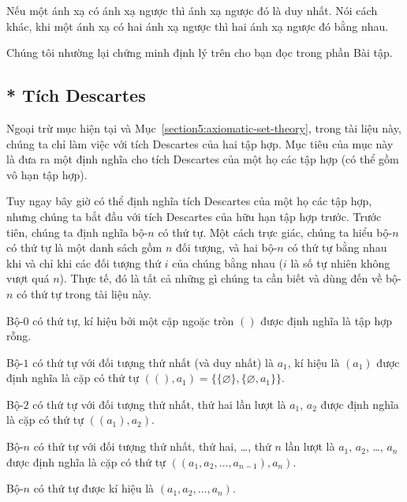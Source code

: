 \begin{theorem}
    Nếu một ánh xạ có ánh xạ ngược thì ánh xạ ngược đó là duy nhất. Nói cách khác, khi một ánh xạ có hai ánh xạ ngược thì hai ánh xạ ngược đó bằng nhau.
\end{theorem}

Chúng tôi nhường lại chứng minh định lý trên cho bạn đọc trong phần Bài tập.

\subsection{* Tích Descartes}

Ngoại trừ mục hiện tại và Mục~\ref{section5:axiomatic-set-theory}, trong tài liệu này, chúng ta chỉ làm việc với tích Descartes của hai tập hợp. Mục tiêu của mục này là đưa ra một định nghĩa cho tích Descartes của một họ các tập hợp (có thể gồm vô hạn tập hợp).

Tuy ngay bây giờ có thể định nghĩa tích Descartes của một họ các tập hợp, nhưng chúng ta bắt đầu với tích Descartes của hữu hạn tập hợp trước. Trước tiên, chúng ta định nghĩa bộ-$n$ có thứ tự. Một cách trực giác, chúng ta hiểu bộ-$n$ có thứ tự là một danh sách gồm $n$ đối tượng, và hai bộ-$n$ có thứ tự bằng nhau khi và chỉ khi các đối tượng thứ $i$ của chúng bằng nhau ($i$ là số tự nhiên không vượt quá $n$). Thực tế, đó là tất cả những gì chúng ta cần biết và dùng đến về bộ-$n$ có thứ tự trong tài liệu này.

\begin{definition}[Bộ-$n$ có thứ tự]
    Bộ-$0$ có thứ tự, kí hiệu bởi một cặp ngoặc tròn $()$ được định nghĩa là tập hợp rỗng.

    Bộ-$1$ có thứ tự với đối tượng thứ nhất (và duy nhất) là $a_{1}$, kí hiệu là $(a_{1})$ được định nghĩa là cặp có thứ tự $((), a_{1}) = \{ \{ \varnothing \}, \{ \varnothing, a_{1} \} \}$.

    Bộ-$2$ có thứ tự với đối tượng thứ nhất, thứ hai lần lượt là $a_{1}$, $a_{2}$ được định nghĩa là cặp có thứ tự $((a_{1}), a_{2})$.

    Bộ-$n$ có thứ tự với đối tượng thứ nhất, thứ hai, \ldots, thứ $n$ lần lượt là $a_{1}$, $a_{2}$, \ldots, $a_{n}$ được định nghĩa là cặp có thứ tự $((a_{1}, a_{2}, \ldots, a_{n-1}), a_{n})$.

    Bộ-$n$ có thứ tự được kí hiệu là $(a_{1}, a_{2}, \ldots, a_{n})$.
\end{definition}


